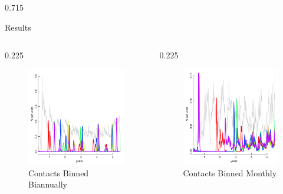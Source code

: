 \documentclass[final]{beamer} %
\newcommand{\spaceProp}{0.02}
\newcommand{\spacer}{\begin{column}{\spaceProp\paperwidth}\end{column}}
\newenvironment{oneCol}{\begin{column}[t]{0.225\paperwidth}}{\end{column}}
\newenvironment{threeCol}{\begin{column}[t]{0.715\paperwidth}}{\end{column}}
\begin{document}
\begin{frame}{}
\begin{columns}[t]
\begin{threeCol}
\begin{block}{Results}
\begin{columns}
\begin{oneCol}
\begin{figure}
      \end{figure}
      \setcounter{figure}{4}
      \begin{figure}
        \includegraphics[width=1.0\linewidth]{out180.png}
        \caption{Contacts Binned Biannually}
      \end{figure}  
    \end{oneCol}
    \begin{oneCol}
      \setcounter{figure}{2}
      \begin{figure}
        \caption{Contacts Binned Monthly}
        \includegraphics[width=1.0\linewidth]{out30.png}

\end{figure}
\end{oneCol}
\end{columns}
\end{block}
\end{threeCol}
\end{columns}
\end{frame}
\end{document}

